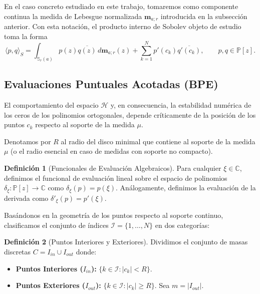 \documentclass[12pt,a4paper]{article}
\theoremstyle{definition}
\newtheorem{definition}{Definición}
\theoremstyle{remark}
\newcommand{\C}{\mathbb{C}}
\newcommand{\Poly}{\mathbb{P}[z]}
\newcommand{\abs}[1]{\left| #1 \right|}
\begin{document}
En el caso concreto estudiado en este trabajo, tomaremos como componente continua la medida de Lebesgue normalizada $\mathbf{m}_{a;r}$ introducida en la subsección anterior. Con esta notación, el producto interno de Sobolev objeto de estudio toma la forma
\begin{equation} \label{eq:sobolev_concreto}
	\langle p, q \rangle_S = \int_{\mathbb{S}_r(a)} p(z)\overline{q(z)} \, d\mathbf{m}_{a;r}(z) + \sum_{k=1}^N p'(c_k)\overline{q'(c_k)}, \qquad p, q \in \mathbb{P}[z].
\end{equation}

\subsection{Evaluaciones Puntuales Acotadas (BPE)}

El comportamiento del espacio $\mathcal{H}$ y, en consecuencia, la estabilidad numérica de los ceros de los polinomios ortogonales, depende críticamente de la posición de los puntos $c_k$ respecto al soporte de la medida $\mu$.

Denotamos por $R$ al radio del disco minimal que contiene al soporte de la medida $\mu$ (o el radio esencial en caso de medidas con soporte no compacto).

\begin{definition}[Funcionales de Evaluación Algebraicos]
	Para cualquier $\xi \in \C$, definimos el funcional de evaluación lineal sobre el espacio de polinomios $\delta_\xi : \Poly \to \C$ como $\delta_\xi(p) = p(\xi)$. Análogamente, definimos la evaluación de la derivada como $\delta'_\xi(p) = p'(\xi)$.
\end{definition}

Basándonos en la geometría de los puntos respecto al soporte continuo, clasificamos el conjunto de índices $\mathcal{I} = \{1, \dots, N\}$ en dos categorías:

\begin{definition}[Puntos Interiores y Exteriores] \label{def:class_points}
	Dividimos el conjunto de masas discretas $C = I_{in} \cup I_{out}$ donde:
	\begin{itemize}
		\item \textbf{Puntos Interiores ($I_{in}$):} $\{k \in \mathcal{I} : \abs{c_k} < R\}$.
		\item \textbf{Puntos Exteriores ($I_{out}$):} $\{k \in \mathcal{I} : \abs{c_k} \geq R\}$. Sea $m = |I_{out}|$.
	\end{itemize}
\end{definition}
\end{document}
